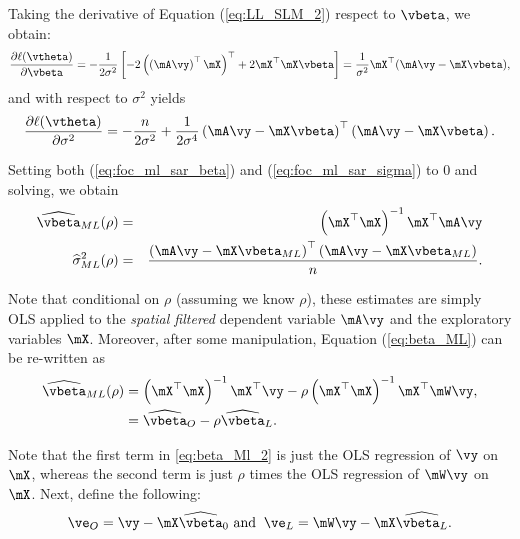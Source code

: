 Taking the derivative of Equation (\ref{eq:LL_SLM_2}) respect to $\vbeta$, we obtain:
\begin{equation}\label{eq:foc_ml_sar_beta}
\frac{\partial \ell(\vtheta)}{\partial \vbeta} = -\frac{1}{2\sigma^2}\left[-2\left(\left(\mA\vy\right)^\top\mX\right)^\top + 2 \mX^\top\mX\vbeta\right] = \frac{1}{\sigma^2}\mX^\top(\mA\vy - \mX\vbeta),
\end{equation}
%
and with respect to $\sigma^2$ yields
\begin{equation}\label{eq:foc_ml_sar_sigma}
\frac{\partial \ell(\vtheta)}{\partial \sigma^2} = -\frac{n}{2\sigma^2} + \frac{1}{2\sigma^4}\left(\mA\vy - \mX\vbeta\right)^\top\left(\mA\vy - \mX\vbeta\right).
\end{equation}

Setting both (\ref{eq:foc_ml_sar_beta}) and (\ref{eq:foc_ml_sar_sigma}) to 0 and solving, we obtain
\begin{eqnarray}
	\widehat{\vbeta}_{ML}(\rho) &=& \left(\mX^\top\mX\right)^{-1}\mX^\top\mA\vy \label{eq:beta_ML} \\
	\widehat{\sigma}^2_{ML}(\rho) &=& \frac{\left(\mA\vy - \mX\vbeta_{ML}\right)^\top\left(\mA\vy - \mX\vbeta_{ML}\right)}{n}\label{eq:sigma_ML}.
\end{eqnarray}

Note that conditional on $\rho$ (assuming we know $\rho$), these estimates are simply OLS applied to the \emph{spatial filtered} dependent variable $\mA\vy$ and the exploratory variables $\mX$. Moreover, after some manipulation, Equation (\ref{eq:beta_ML}) can be re-written as
\begin{equation}\label{eq:beta_Ml_2}
\begin{aligned}
\widehat{\vbeta}_{ML}(\rho) &= \left(\mX^\top\mX\right)^{-1}\mX^\top\vy - \rho\left(\mX^\top\mX\right)^{-1}\mX^\top\mW\vy, \\
&= \widehat{\vbeta}_O -\rho \widehat{\vbeta}_L.
\end{aligned}
\end{equation}

Note that the first term in \eqref{eq:beta_Ml_2} is just the OLS regression of $\vy$ on $\mX$, whereas the second term is just $\rho$ times the OLS regression of $\mW\vy$ on $\mX$. Next, define the following:
\begin{equation}\label{eq:SLM_aux_residuals}
\ve_O = \vy - \mX\widehat{\vbeta}_0\,\,\mbox{and} \;\; \ve_L = \mW\vy - \mX\widehat{\vbeta_L}.
\end{equation}


